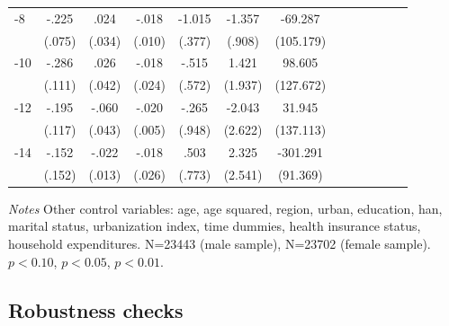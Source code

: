 \begin{table}[p]
\begin{adjustbox}{max width=\linewidth}
\begin{threeparttable}
{\begin{tabular}{l*{6}{S S}}
-8             &    -.225\sym{***}&     .024         &    -.018\sym{*}  &   -1.015\sym{***}&   -1.357         &  -69.287         \\
                &   (.075)         &   (.034)         &   (.010)         &   (.377)         &   (.908)         &(105.179)         \\
-10            &    -.286\sym{**} &     .026         &    -.018         &    -.515         &    1.421         &   98.605         \\
                &   (.111)         &   (.042)         &   (.024)         &   (.572)         &  (1.937)         &(127.672)         \\
-12           &    -.195\sym{*}  &    -.060         &    -.020\sym{***}&    -.265         &   -2.043         &   31.945         \\
                &   (.117)         &   (.043)         &   (.005)         &   (.948)         &  (2.622)         &(137.113)         \\
-14           &    -.152         &    -.022\sym{*}  &    -.018         &     .503         &    2.325         & -301.291\sym{***}\\
                &   (.152)         &   (.013)         &   (.026)         &   (.773)         &  (2.541)         & (91.369)         \\   
\bottomrule
\end{tabular}
\begin{tablenotes}
\item \textit{Notes} Other control variables: age, age squared, region, urban, education, han, marital status, urbanization index, time dummies, health insurance status, household expenditures. N=23443 (male sample), N=23702 (female sample). \sym{*} \(p<0.10\), \sym{**} \(p<0.05\), \sym{***} \(p<0.01\).
\end{tablenotes}
}
\end{threeparttable}
\end{adjustbox}
\end{table}
\FloatBarrier

\clearpage
\subsection*{Robustness checks}

